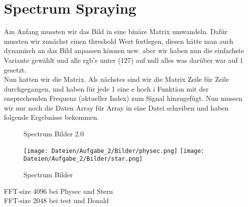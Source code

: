 \documentclass[12pt,a4paper]{article}
\begin{document}
\section{Spectrum Spraying}
Am Anfang mussten wir das Bild in eine binäre Matrix umwandeln. Dafür mussten wir zunächst einen threshold Wert festlegen, diesen hätte man auch dynamisch an das Bild anpassen können usw. aber wir haben nun die einfachste Variante gewählt und alle rgb's unter (127) auf null alles was darüber war auf 1 gesetzt. \\
Nun hatten wir die Matrix. Als nächstes sind wir die Matrix Zeile für Zeile durchgegangen, und haben für jede 1 eine e hoch i Funktion mit der ensprechenden Frequenz (aktueller Index) zum Signal hinzugefügt. Nun mussen wir nur noch die Daten Array für Array in eine Datei schreiben und haben folgende Ergebnisse bekommen. \\
\begin{figure}[H]
\centering
\qquad
{}
\caption{Spectrum Bilder 2.0}
\label{fig:2_2}
\end{figure}
\begin{figure}[H]
\centering
\texttt{[image: Dateien/Aufgabe\_2/Bilder/physec.png]} 
\texttt{[image: Dateien/Aufgabe\_2/Bilder/star.png]} 
\caption{Spectrum Bilder}
\label{fig:2_1}
\end{figure}
FFT-size 4096 bei Physec und Stern\\
FFT-size 2048 bei test und Donald\\
\end{document}
